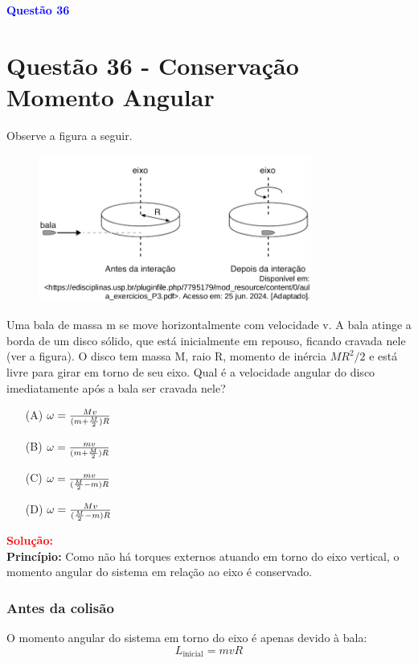 \documentclass[a4paper,12pt]{article}
\begin{document}
\begin{flushleft}
\textbf{\textcolor{blue}{\Large Quest\~ao 36 }}\\
\noindent
\section{Quest\~ao 36 - Conserva\c{c}\~ao Momento Angular}
Observe a figura a seguir.

\begin{figure}[h]
\centering
\includegraphics[width=0.8\textwidth]{figures/momento_angular.png}
\end{figure}

Uma bala de massa m se move horizontalmente com
velocidade v. A bala atinge a borda de um disco sólido, que
está inicialmente em repouso, ficando cravada nele (ver a
figura). O disco tem massa M, raio R, momento de inércia
$MR^{2}/2$ e está livre para girar em torno de seu eixo. Qual é a
velocidade angular do disco imediatamente após a bala ser
cravada nele?

\begin{itemize}
\item[(A)] $\Huge \omega = \frac{Mv}{(m+\frac{M}{2})R}$
\item[(B)] $\Huge \omega = \frac{mv}{(m+\frac{M}{2})R}$
\item[(C)] $\Huge \omega = \frac{mv}{(\frac{M}{2}-m)R}$
\item[(D)] $\Huge \omega = \frac{Mv}{(\frac{M}{2}-m)R}$
\end{itemize}

\vspace{0.5cm}

\textcolor{red}{\textbf{Solução:}}\\

\textbf{Princípio:}  
Como não há torques externos atuando em torno do eixo vertical, o momento angular do sistema em relação ao eixo é conservado.

\subsubsection*{Antes da colisão}
O momento angular do sistema em torno do eixo é apenas devido à bala:
\[
L_{\text{inicial}} = m v R
\]


\end{flushleft}
\end{document}
